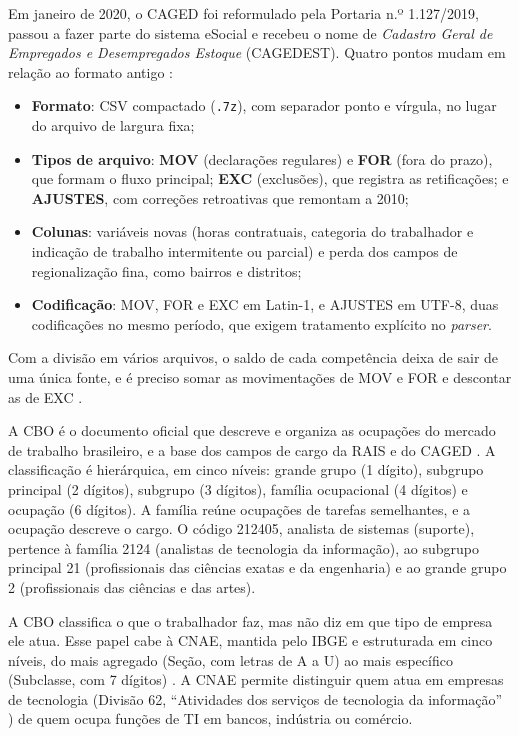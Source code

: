 Em janeiro de 2020, o CAGED foi reformulado pela Portaria n.º 1.127/2019, passou a fazer parte do sistema eSocial e recebeu o nome de \textit{Cadastro Geral de Empregados e Desempregados Estoque} (CAGEDEST). Quatro pontos mudam em relação ao formato antigo \cite{CAGED2024}:

\begin{itemize}
    \item \textbf{Formato}: CSV compactado (\texttt{.7z}), com separador ponto e vírgula, no lugar do arquivo de largura fixa;
    \item \textbf{Tipos de arquivo}: \textbf{MOV} (declarações regulares) e \textbf{FOR} (fora do prazo), que formam o fluxo principal; \textbf{EXC} (exclusões), que registra as retificações; e \textbf{AJUSTES}, com correções retroativas que remontam a 2010;
    \item \textbf{Colunas}: variáveis novas (horas contratuais, categoria do trabalhador e indicação de trabalho intermitente ou parcial) e perda dos campos de regionalização fina, como bairros e distritos;
    \item \textbf{Codificação}: MOV, FOR e EXC em Latin-1, e AJUSTES em UTF-8, duas codificações no mesmo período, que exigem tratamento explícito no \textit{parser}.
\end{itemize}

Com a divisão em vários arquivos, o saldo de cada competência deixa de sair de uma única fonte, e é preciso somar as movimentações de MOV e FOR e descontar as de EXC \cite{CAGED2024}.

A CBO é o documento oficial que descreve e organiza as ocupações do mercado de trabalho brasileiro, e a base dos campos de cargo da RAIS e do CAGED \cite{CBO2024}. A classificação é hierárquica, em cinco níveis: grande grupo (1 dígito), subgrupo principal (2 dígitos), subgrupo (3 dígitos), família ocupacional (4 dígitos) e ocupação (6 dígitos). A família reúne ocupações de tarefas semelhantes, e a ocupação descreve o cargo. O código 212405, analista de sistemas (suporte), pertence à família 2124 (analistas de tecnologia da informação), ao subgrupo principal 21 (profissionais das ciências exatas e da engenharia) e ao grande grupo 2 (profissionais das ciências e das artes).

A CBO classifica o que o trabalhador faz, mas não diz em que tipo de empresa ele atua. Esse papel cabe à CNAE, mantida pelo IBGE e estruturada em cinco níveis, do mais agregado (Seção, com letras de A a U) ao mais específico (Subclasse, com 7 dígitos) \cite{CNAE2024}. A CNAE permite distinguir quem atua em empresas de tecnologia (Divisão 62, ``Atividades dos serviços de tecnologia da informação'' \cite{CNAE2024}) de quem ocupa funções de TI em bancos, indústria ou comércio.

